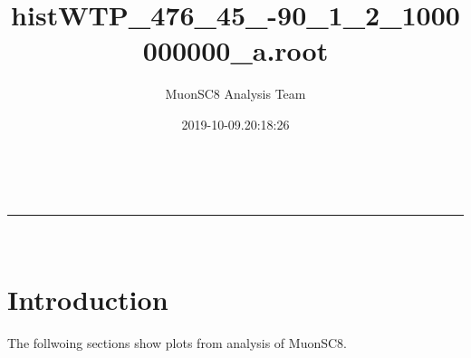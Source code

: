 \documentclass[a4paper,11pt]{article}
\makeatletter
\newcommand{\linia}{\rule{\linewidth}{0.5pt}}
\theoremstyle{mytheor}
\renewcommand{\maketitle}{
\begin{center}
\vspace{2ex}
{\huge \textsc{\@title}}
\vspace{1ex}
\\
\linia\\
\@author \hfill \@date
\vspace{4ex}
\end{center}
}
\makeatother
\begin{document}
\title{histWTP\_476\_45\_-90\_1\_2\_1000000000\_a.root}

\author{MuonSC8 Analysis Team }

\date{2019-10-09.20:18:26}

\maketitle

\section{Introduction}

The follwoing sections show plots from analysis of MuonSC8. 





\end{document}
